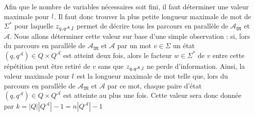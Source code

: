 \documentclass[12pt,a4paper,oneside,titlepage]{report}
\begin{document}
\noindent Afin que le nombre de variables nécessaires soit fini, il faut déterminer une valeur maximale pour $\mathnormal{l}$. Il faut donc trouver la plus petite longueur maximale de mot de $\Sigma^*$ pour laquelle $z_{q,q^\mathcal{A},\mathnormal{l}}$ permet de décrire tous les parcours en  parallèle de $\mathcal{A}_\mathfrak{M}$ et $\mathcal{A}$. Nous allons déterminer cette valeur sur base d'une simple observation : si, lors du parcours en parallèle de $\mathcal{A}_\mathfrak{M}$ et $\mathcal{A}$ par un mot $v\in\Sigma$ un état $(q,q^\mathcal{A})\in Q\times Q^\mathcal{A}$ est atteint deux fois, alors le facteur $w\in\Sigma^*$ de $v$ entre cette répétition peut être retiré de $v$ sans que $z_{q,q^\mathcal{A},\mathnormal{l}}$ ne perde d'information. Ainsi, la valeur maximale pour $\mathnormal{l}$ est la longueur maximale de mot telle que, lors du parcours en parallèle de $\mathcal{A}_\mathfrak{M}$ et $\mathcal{A}$ par ce mot, chaque paire d'état $(q,q^\mathcal{A})\in Q\times Q^\mathcal{A}$ est atteinte au plus une fois. Cette valeur sera donc donnée par $k=|Q||Q^\mathcal{A}|-1=n|Q^\mathcal{A}|-1$\\
\end{document}
